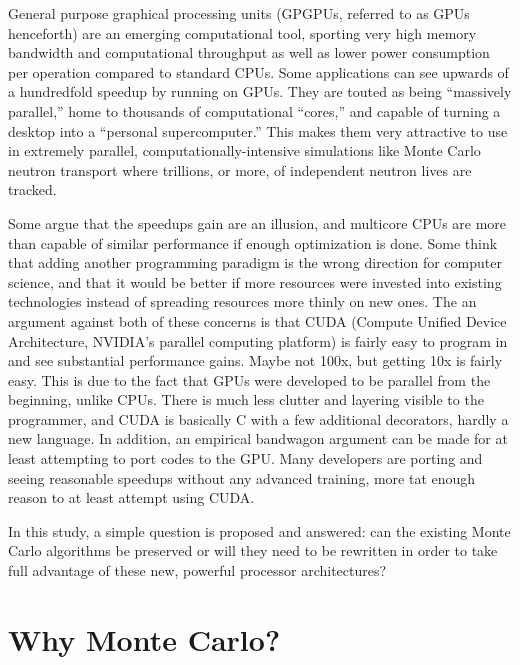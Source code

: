 General purpose graphical processing units (GPGPUs, referred to as GPUs henceforth) are an emerging computational tool, sporting very high memory bandwidth and computational throughput as well as lower power consumption per operation compared to standard CPUs.  Some applications can see upwards of a hundredfold speedup by running on GPUs.  They are touted as being ``massively parallel,'' home to thousands of computational ``cores,'' and capable of turning a desktop into a ``personal supercomputer.''  This makes them very attractive to use in extremely parallel, computationally-intensive simulations like Monte Carlo neutron transport where trillions, or more, of independent neutron lives are tracked.   

Some argue that the speedups gain are an illusion, and multicore CPUs are more than capable of similar performance if enough optimization is done. Some think that adding another programming paradigm is the wrong direction for computer science, and that it would be better if more resources were invested into existing technologies instead of spreading resources more thinly on new ones.  The an argument against both of these concerns is that CUDA (Compute Unified Device Architecture, NVIDIA's parallel computing platform) is fairly easy to program in and see substantial performance gains.  Maybe not 100x, but getting 10x is fairly easy.  This is due to the fact that GPUs were developed to be parallel from the beginning, unlike CPUs.  There is much less clutter and layering visible to the programmer, and CUDA is basically C with a few additional decorators, hardly a new language.   In addition, an empirical  bandwagon argument can be made for at least attempting to port codes to the GPU.  Many developers are porting and seeing reasonable speedups without any advanced training, more tat enough reason to at least attempt using CUDA. 

In this study, a simple question is proposed and answered: can the existing Monte Carlo algorithms be preserved or will they need to be rewritten in order to take full advantage of these new, powerful processor architectures?

\section{Why Monte Carlo?}

